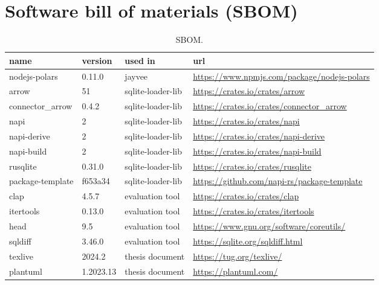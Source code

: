 \section{Software bill of materials (SBOM)}
\begin{table}[H]
	\caption{SBOM.}
	\label{tab:sbom}
	\begin{center}
		\begin{tabularx}{\textwidth}{|l|l|l|X|}
			\hline
			name             & version   & used in           & url                                               \\
			\hline
			\hline
			nodejs-polars    & 0.11.0    & jayvee            & \url{https://www.npmjs.com/package/nodejs-polars} \\
			\hline
			arrow            & 51        & sqlite-loader-lib & \url{https://crates.io/crates/arrow}              \\
			connector\_arrow & 0.4.2     & sqlite-loader-lib & \url{https://crates.io/crates/connector_arrow}    \\
			napi             & 2         & sqlite-loader-lib & \url{https://crates.io/crates/napi}               \\
			napi-derive      & 2         & sqlite-loader-lib & \url{https://crates.io/crates/napi-derive}        \\
			napi-build       & 2         & sqlite-loader-lib & \url{https://crates.io/crates/napi-build}         \\
			rusqlite         & 0.31.0    & sqlite-loader-lib & \url{https://crates.io/crates/rusqlite}           \\
			package-template & f653a34   & sqlite-loader-lib & \url{https://github.com/napi-rs/package-template} \\
			\hline
			clap             & 4.5.7     & evaluation tool   & \url{https://crates.io/crates/clap}               \\
			itertools        & 0.13.0    & evaluation tool   & \url{https://crates.io/crates/itertools}          \\
			head             & 9.5       & evaluation tool   & \url{https://www.gnu.org/software/coreutils/}     \\
			sqldiff          & 3.46.0    & evaluation tool   & \url{https://sqlite.org/sqldiff.html}             \\
			\hline
			texlive          & 2024.2    & thesis document   & \url{https://tug.org/texlive/}                    \\
			plantuml         & 1.2023.13 & thesis document   & \url{https://plantuml.com/}                       \\
			\hline
		\end{tabularx}
	\end{center}
\end{table}


